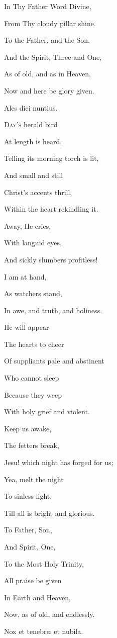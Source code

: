 In Thy Father Word Divine,

From Thy cloudy pillar shine. 

To the Father, and the Son,

And the Spirit, Three and One,

As of old, and as in Heaven,

Now and here be glory given.


Ales diei nuntius.

D\textsc{ay's} herald bird

At length is heard,

Telling its morning torch is lit,

And small and still

Christ's accents
thrill,

Within the heart rekindling it.

Away, He cries,

With languid eyes,

And sickly slumbers profitless!

I am at hand,

As watchers stand,

In awe, and truth, and holiness.

He will appear

The hearts to cheer

Of suppliants pale and abstinent

Who cannot sleep

Because they weep

With holy grief and violent.

Keep us awake,

The fetters break,

Jesu! which night has forged for us;

Yea, melt the night

To sinless light,

Till all is bright and glorious.

To Father, Son,

And Spirit, One,

To the Most Holy Trinity,

All praise be given

In Earth and
Heaven,

Now, as of old, and endlessly.


Nox et tenebræ et nubila.

